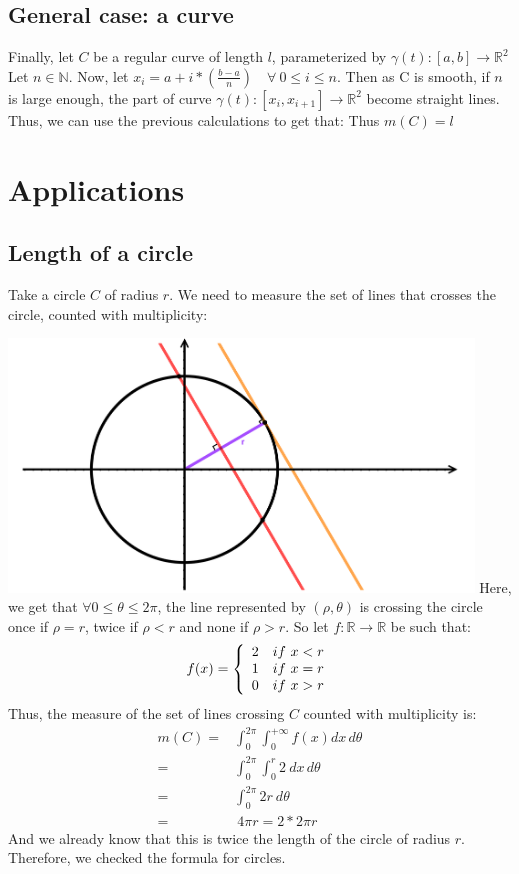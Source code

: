 \documentclass[a4paper]{article}
\begin{document}
\subsection{General case: a curve}
Finally, let $C$ be a regular curve of length $l$, parameterized by $\gamma(t): [a,b] \to \mathbb{R}^2$
Let $n \in \mathbb{N}$. Now, let $x_i = a + i *(\frac{b-a}{n}) \quad \forall \ 0 \leq i \leq n$.
Then as C is smooth, if $n$ is large enough, the part of curve $\gamma(t): [x_i, x_{i+1}] \to \mathbb{R}^2$ become straight lines.
Thus, we can use the previous calculations to get that:
Thus $m(C) = l$



\section{Applications}
\subsection{Length of a circle}
Take a circle $C$ of radius $r$.
We need to measure the set of lines that crosses the circle, counted with multiplicity:

\includegraphics[width=350pt]{img/figureCircleExample.png}
Here, we get that $\forall 0 \leq \theta \leq 2\pi$, the line represented by $(\rho, \theta)$ is crossing the circle once if $\rho = r$, twice if $\rho < r$ and none if $\rho > r$.
So let $f:\mathbb{R} \to \mathbb{R}$ be such that:
$$f(x) = \left\{
\begin{array}{r c l}
2 \quad if \ x < r\\
1 \quad if \ x = r\\
0 \quad if \ x > r
\end{array}
\right.$$
Thus, the measure of the set of lines crossing $C$ counted with multiplicity is:
\begin{align}
m(C) =& \int_0^{2\pi}\int_0^{+\infty} f(x) dx\,d\theta \\
=& \int_0^{2\pi}\int_0^{r} 2 \ dx\,d\theta \\
=& \int_0^{2\pi} 2 r \ d\theta \\
=& \ 4 \pi r = 2* 2\pi r
\end{align}
And we already know that this is twice the length of the circle of radius $r$.
Therefore, we checked the formula for circles.
\end{document}
